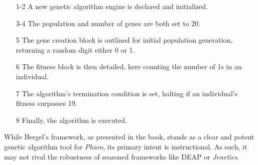   \begin{enumerate}
      \item[1-2] A new genetic algorithm engine is declared and initialized.
      \item[3-4] The population and number of genes are both set to 20.
      \item[5] The gene creation block is outlined for initial population 
        generation, returning a random digit either 0 or 1.
      \item[6] The fitness block is then detailed, here counting the number of 
        1s in an individual.
      \item[7] The algorithm's termination condition is set, halting if an 
        individual's fitness surpasses 19.
      \item[8] Finally, the algorithm is executed.
  \end{enumerate}

  While Bergel's framework, as presented in the book, stands as a clear and 
  potent genetic algorithm tool for \textit{Pharo}, its primary intent is 
  instructional.
  As such, it may not rival the robustness of seasoned frameworks like DEAP or 
  \textit{Jenetics}.
